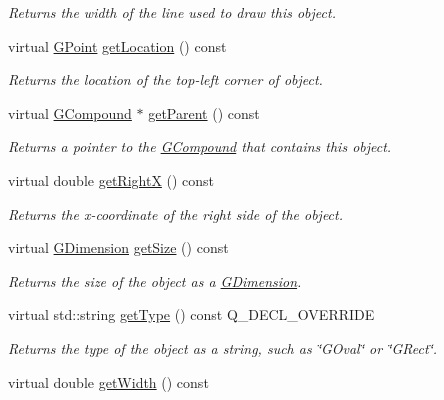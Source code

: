 \begin{DoxyCompactItemize}
\begin{DoxyCompactList}\small\item\em Returns the width of the line used to draw this object. \end{DoxyCompactList}\item 
virtual \mbox{\hyperlink{classGPoint}{G\+Point}} \mbox{\hyperlink{classGObject_a4f83802015511edeb63b892830812c11}{get\+Location}} () const
\begin{DoxyCompactList}\small\item\em Returns the location of the top-\/left corner of object. \end{DoxyCompactList}\item 
virtual \mbox{\hyperlink{classGCompound}{G\+Compound}} $\ast$ \mbox{\hyperlink{classGObject_a3e53cef70541b1a14eade4ad0984d0b4}{get\+Parent}} () const
\begin{DoxyCompactList}\small\item\em Returns a pointer to the {\ttfamily \mbox{\hyperlink{classGCompound}{G\+Compound}}} that contains this object. \end{DoxyCompactList}\item 
virtual double \mbox{\hyperlink{classGObject_a798cc79daaa10145b28f60bcdfdb0ee9}{get\+RightX}} () const
\begin{DoxyCompactList}\small\item\em Returns the {\itshape x}-\/coordinate of the right side of the object. \end{DoxyCompactList}\item 
virtual \mbox{\hyperlink{classGDimension}{G\+Dimension}} \mbox{\hyperlink{classGObject_a7b4eec96a2bdc6420695d5796a78eea9}{get\+Size}} () const
\begin{DoxyCompactList}\small\item\em Returns the size of the object as a {\ttfamily \mbox{\hyperlink{classGDimension}{G\+Dimension}}}. \end{DoxyCompactList}\item 
virtual std\+::string \mbox{\hyperlink{classGCompound_a9896d58fcfebbf1025aeeb5b8b9ede80}{get\+Type}} () const Q\+\_\+\+D\+E\+C\+L\+\_\+\+O\+V\+E\+R\+R\+I\+DE
\begin{DoxyCompactList}\small\item\em Returns the type of the object as a string, such as {\ttfamily \char`\"{}\+G\+Oval\char`\"{}} or {\ttfamily \char`\"{}\+G\+Rect\char`\"{}}. \end{DoxyCompactList}\item 
virtual double \mbox{\hyperlink{classGObject_a0ed2965abd4f5701d2cadf71239faf19}{get\+Width}} () const

\end{DoxyCompactItemize}
